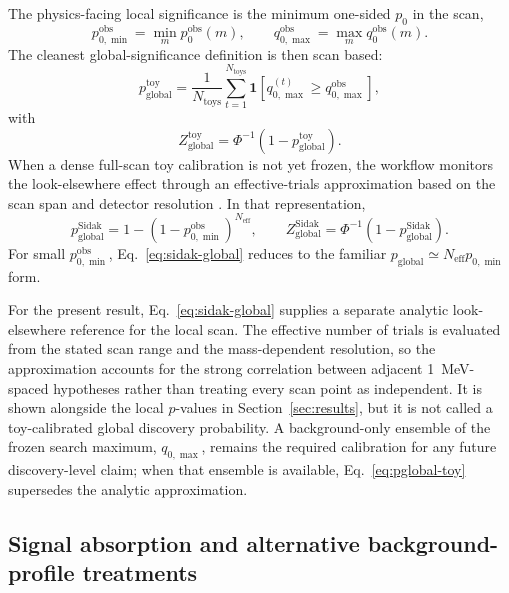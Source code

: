 The physics-facing local significance is the minimum one-sided $p_0$ in the scan,
\begin{equation}
p_{0,\min}^{\mathrm{obs}} = \min_m p_0^{\mathrm{obs}}(m),
\qquad
q_{0,\max}^{\mathrm{obs}} = \max_m q_0^{\mathrm{obs}}(m).
\end{equation}
The cleanest global-significance definition is then scan based:
\begin{equation}
p_{\mathrm{global}}^{\mathrm{toy}}
=
\frac{1}{N_{\mathrm{toys}}}
\sum_{t=1}^{N_{\mathrm{toys}}}
\mathbf{1}\!\left[
q_{0,\max}^{(t)} \ge q_{0,\max}^{\mathrm{obs}}
\right],
\label{eq:pglobal-toy}
\end{equation}
with
\begin{equation}
Z_{\mathrm{global}}^{\mathrm{toy}} = \Phi^{-1}\!\left(1-p_{\mathrm{global}}^{\mathrm{toy}}\right).
\end{equation}
When a dense full-scan toy calibration is not yet frozen, the workflow monitors the
look-elsewhere effect through an effective-trials approximation based on the scan span
and detector resolution \cite{GrossVitells2010}. In that representation,
\begin{equation}
p_{\mathrm{global}}^{\mathrm{Sidak}}
=
1-\left(1-p_{0,\min}^{\mathrm{obs}}\right)^{N_{\mathrm{eff}}},
\qquad
Z_{\mathrm{global}}^{\mathrm{Sidak}}
=
\Phi^{-1}\!\left(1-p_{\mathrm{global}}^{\mathrm{Sidak}}\right).
\label{eq:sidak-global}
\end{equation}
For small $p_{0,\min}^{\mathrm{obs}}$, Eq.~\eqref{eq:sidak-global} reduces to the
familiar $p_{\mathrm{global}}\simeq N_{\mathrm{eff}}p_{0,\min}$ form.

For the present result, Eq.~\eqref{eq:sidak-global} supplies a separate analytic
look-elsewhere reference for the local scan. The effective number of trials is
evaluated from the stated scan range and the mass-dependent resolution, so the
approximation accounts for the strong correlation between adjacent
\SI{1}{MeV}-spaced hypotheses rather than treating every scan point as independent.
It is shown alongside the local $p$-values in Section~\ref{sec:results}, but it is not
called a toy-calibrated global discovery probability. A background-only ensemble of
the frozen search maximum, $q_{0,\max}$, remains the required calibration for any
future discovery-level claim; when that ensemble is available,
Eq.~\eqref{eq:pglobal-toy} supersedes the analytic approximation.

\subsection{Signal absorption and alternative background-profile treatments}

